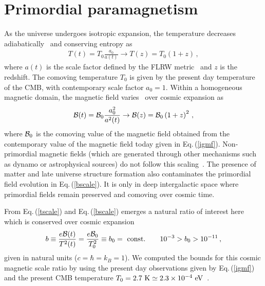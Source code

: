 \documentclass[a4paper]{article}
\newcommand*{\eV}{\text{ eV}}
\newcommand{\req}[1]{Eq.\,(\ref{#1})}
\newcommand*{\xblue}{\color{black}}
\begin{document}
\section{Primordial paramagnetism }
\label{sec:fugacity}
\noindent
As the universe undergoes isotropic expansion, the temperature decreases {\xblue adiabatically~\cite{abdalla2022cosmology} and conserving entropy} as 
\begin{align}
    \label{tscale}
    T(t)=T_{0}\frac{a_{0}}{a(t)}\rightarrow T(z)=T_{0}(1+z)\,,
\end{align}
where $a(t)$ is the scale factor defined by the FLRW metric~\cite{weinberg1972gravitation} and $z$ is the redshift. The comoving temperature $T_{0}$ is given by the present day temperature of the CMB, with contemporary scale factor $a_{0}=1$. Within a homogeneous magnetic domain, the magnetic field varies~\cite{durrer2013cosmological} over cosmic expansion as
\begin{align}
    \label{bscale}
    {\cal B}(t)={\cal B}_{0}\frac{a_{0}^{2}}{a^{2}(t)}\rightarrow{\cal B}(z)={\cal B}_{0}\left(1+z\right)^{2}\,,
\end{align}
where ${\cal B}_{0}$ is the comoving value of the magnetic field obtained from the contemporary value of the magnetic field today  given in \req{igmf}. Non-primordial magnetic fields (which are generated through other mechanisms  such as dynamo or astrophysical sources) do not follow this scaling~\cite{pomakov2022redshift}. The presence of matter and late universe structure formation also  contaminates the primordial field evolution in \req{bscale}. It is only in deep intergalactic space where primordial fields remain preserved and comoving over cosmic time.

From \req{tscale} and \req{bscale} emerges a natural ratio of interest here which is conserved over cosmic expansion 
\begin{align}
    \label{tbscale}
    b \equiv\frac{e{\cal B}(t)}{T^{2}(t)}=\frac{e{\cal B}_{0}}{T_{0}^{2}}\equiv b_0={\rm\ const.}\qquad10^{-3}>b_{0}>10^{-11}\,,
\end{align}
given in natural units ($c=\hbar=k_{B}=1$). We computed the bounds for this cosmic magnetic scale ratio by using the present day observations given by \req{igmf} and the present CMB temperature $T_{0}=2.7{\rm\ K}\simeq2.3\times10^{-4}\eV$~\cite{aghanim2018planck}.
\end{document}
